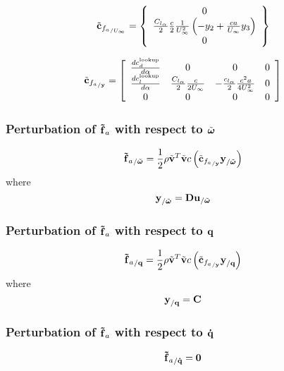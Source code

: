 \begin{equation}
\tilde{\bm{\mathbf{c}}}_{{f_{a}}_{/U_{\infty}}} = \left\{
	\begin{array}{c}
		0 \\
		\frac{C_{l_{\alpha}}}{2} \frac{c}{2} \frac{1}{U_\infty^2} 
		\left(  -y_2 + \frac{c a}{U_\infty} y_3 \right) \\
		0
	\end{array} \right\}
\end{equation}

\begin{equation}
\tilde{\bm{\mathbf{c}}}_{{f_{a}}_{/\bm{\mathbf{y}}}} = \left[
	\begin{array}{cccc}
		\frac{ d c_d^{\text{lookup}}}{d \alpha} & 0 & 0 & 0 \\
		\frac{ d c_l^{\text{lookup}}}{d \alpha} & \frac{C_{l_{\alpha}}}{2} \frac{c}{2 U_\infty}&
			-\frac{c_{l_{\alpha}}}{2} \frac{c^2 a}{4 U_\infty^2} & 0 \\
		0 & 0 & 0 & 0
	\end{array} \right]
\end{equation}

\subsubsection{Perturbation of $\bm{\mathbf{\tilde{f}}}_a$ with respect to $\tilde{\bm{\mathbf{\omega}}}$}
\begin{equation}
{\bm{\mathbf{\tilde{f}}}_a}_{/\tilde{\bm{\mathbf{\omega}}}} = 
	\frac{1}{2} \rho \tilde{\bm{\mathbf{v}}}^T \tilde{\bm{\mathbf{v}}} c
	\left(  \tilde{\bm{\mathbf{c}}}_{{f_{a}}_{/\bm{\mathbf{y}}}} \bm{\mathbf{y}}_{/\tilde{\bm{\mathbf{\omega}}}}  \right) 
\end{equation}
where
\begin{equation}
\bm{\mathbf{y}}_{/\tilde{\bm{\mathbf{\omega}}}} = 
	\bm{\mathbf{D}} \bm{\mathbf{u}}_{/\tilde{\bm{\mathbf{\omega}}}}
\end{equation}
\subsubsection{Perturbation of $\bm{\mathbf{\tilde{f}}}_a$ with respect to $\bm{\mathbf{q}}$}
\begin{equation}
{\bm{\mathbf{\tilde{f}}}_a}_{/\bm{\mathbf{q}}} = 
	\frac{1}{2} \rho \tilde{\bm{\mathbf{v}}}^T \tilde{\bm{\mathbf{v}}} c
	\left(  \tilde{\bm{\mathbf{c}}}_{{f_{a}}_{/\bm{\mathbf{y}}}} \bm{\mathbf{y}}_{/\bm{\mathbf{q}}}  \right) 
\end{equation}
where
\begin{equation}
\bm{\mathbf{y}}_{/\bm{\mathbf{q}}} = \bm{\mathbf{C}} 
\end{equation}

\subsubsection{Perturbation of $\bm{\mathbf{\tilde{f}}}_a$ with respect to $\bm{\mathbf{\dot{q}}}$}
\begin{equation}
{\bm{\mathbf{\tilde{f}}}_a}_{/\bm{\mathbf{\dot{q}}}} = \bm{\mathbf{0}}
\end{equation}

